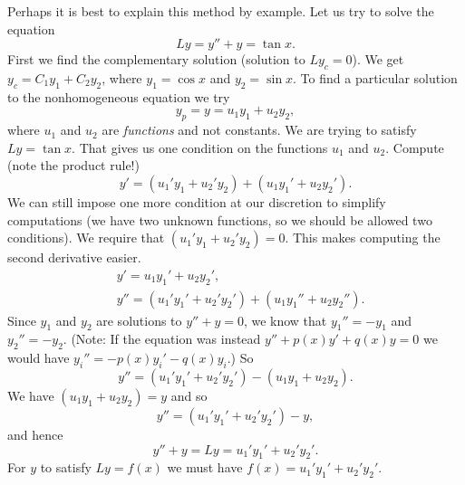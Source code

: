 Perhaps it is best to explain this method by example.
Let us try to solve the equation
\begin{equation*}
Ly = y''+y = \tan x .
\end{equation*}
First we find the complementary solution (solution to $Ly_c = 0$).  
We get $y_c = C_1 y_1 + C_2 y_2$, where $y_1 = \cos x$ and $y_2 = \sin x$.
To find a particular solution to the nonhomogeneous equation we try
\begin{equation*}
y_p = y = u_1 y_1 + u_2 y_2 ,
\end{equation*}
where $u_1$ and $u_2$ are \emph{functions} and not constants.
We are trying to satisfy $Ly = \tan x$.  That gives us one condition on the
functions $u_1$ and $u_2$.
Compute (note the product rule!)
\begin{equation*}
y' = (u_1' y_1 + u_2' y_2) + (u_1 y_1' + u_2 y_2').
\end{equation*}
We can still
impose one more condition at our discretion to simplify computations (we have two unknown functions,
so we should be allowed two conditions).  We require that
$(u_1' y_1 + u_2' y_2) = 0$.  This makes computing the second derivative
easier.
\begin{align*}
& y' = u_1 y_1' + u_2 y_2' , \\
& y'' = (u_1' y_1' + u_2' y_2') + (u_1 y_1'' + u_2 y_2'') .
\end{align*}
Since $y_1$ and $y_2$ are solutions to $y''+y = 0$, we know
that $y_1'' = - y_1$
and $y_2'' = - y_2$.
(Note: If the equation was instead $y''+p(x)y' +q(x)y = 0$ we would have
$y_i'' = -p(x)y_i' -q(x)y_i$.) So 
\begin{equation*}
y'' = (u_1' y_1' + u_2' y_2') - (u_1 y_1 + u_2 y_2) .
\end{equation*}
We have $(u_1 y_1 + u_2 y_2) = y$ and so
\begin{equation*}
y'' = (u_1' y_1' + u_2' y_2') - y ,
\end{equation*}
and hence
\begin{equation*}
y'' + y = Ly = u_1' y_1' + u_2' y_2' .
\end{equation*}
For $y$ to satisfy $Ly = f(x)$ we must have
$f(x) = u_1' y_1' + u_2' y_2'$.

